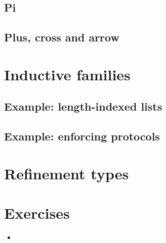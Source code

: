 \documentclass{beamer}
\begin{document}
\subsection{Pi}

\subsection{Plus, cross and arrow}


\section{Inductive families}

\subsection{Example: length-indexed lists}

\subsection{Example: enforcing protocols}

\section{Refinement types}

\section{Exercises}

\begin{frame}{}
\begin{itemize}
	\item 
\end{itemize}
\end{frame}
\end{document}

